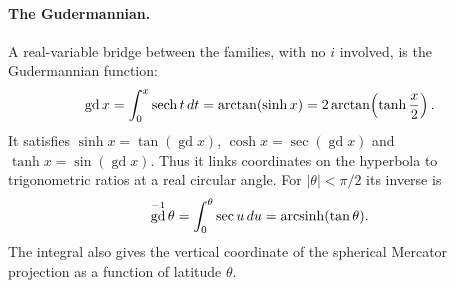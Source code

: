 \documentclass{essay}
\DeclareMathOperator{\gd}{gd}
\begin{document}
\paragraph{The Gudermannian.}
A real-variable bridge between the families, with no $i$ involved, is the
Gudermannian function:
\[
  \gd x = \int_0^x \sech t \, dt = \arctan(\sinh x)
        = 2 \arctan\!\left( \tanh \frac{x}{2} \right).
\]
It satisfies $\sinh x = \tan(\gd x)$, $\cosh x = \sec(\gd x)$ and
$\tanh x = \sin(\gd x)$. Thus it links coordinates on the hyperbola to
trigonometric ratios at a real circular angle. For $|\theta|<\pi/2$ its inverse is
\[
  \gd^{-1}\theta=\int_0^\theta\sec u\,du
    =\arcsinh(\tan\theta).
\]
The integral also gives the vertical coordinate of the spherical Mercator
projection as a function of latitude $\theta$.
\end{document}
